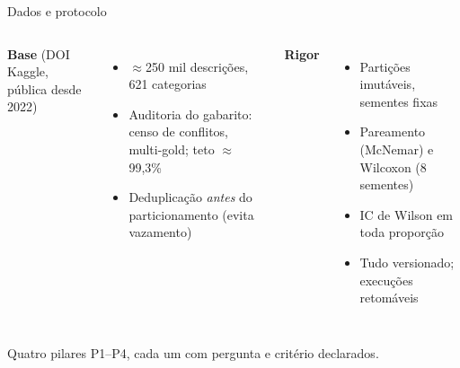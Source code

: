 \documentclass[aspectratio=169,11pt]{beamer}
\begin{document}
\begin{frame}{Dados e protocolo}
\begin{columns}[T]
\textbf{Base} (DOI Kaggle, pública desde 2022)
\begin{itemize}\footnotesize
  \item $\approx$250 mil descrições, 621 categorias
  \item Auditoria do gabarito: censo de conflitos, multi-gold; teto $\approx$99,3\%
  \item Deduplicação \emph{antes} do particionamento (evita vazamento)
\end{itemize}
\textbf{Rigor}
\begin{itemize}\footnotesize
  \item Partições imutáveis, sementes fixas
  \item Pareamento (McNemar) e Wilcoxon (8 sementes)
  \item IC de Wilson em toda proporção
  \item Tudo versionado; execuções retomáveis
\end{itemize}
\end{columns}
\vspace{0.4em}
\footnotesize\color{ufprgreen}
Quatro pilares P1--P4, cada um com pergunta e critério declarados.
\end{frame}


\end{document}
